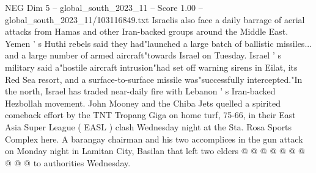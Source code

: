 \begin{textsample}{NEG Dim 5 – global\_south\_2023\_11 – Score 1.00 – global\_south\_2023\_11/103116849.txt}
Israelis also face a daily barrage of aerial attacks from Hamas and other Iran-backed groups around the Middle East.
Yemen ' s Huthi rebels said they had"launched a large batch of ballistic missiles... and a large number of armed aircraft"towards Israel on Tuesday.
Israel ' s military said a"hostile aircraft intrusion"had set off warning sirens in Eilat, its Red Sea resort, and a surface-to-surface missile was"successfully intercepted."In the north, Israel has traded near-daily fire with Lebanon ' s Iran-backed Hezbollah movement.
John Mooney and the Chiba Jets quelled a spirited comeback effort by the TNT Tropang Giga on home turf, 75-66, in their East Asia Super League ( EASL ) clash Wednesday night at the Sta.
Rosa Sports Complex here.
A barangay chairman and his two accomplices in the gun attack on Monday night in Lamitan City, Basilan that left two elders @ @ @ @ @ @ @ @ @ @ to authorities Wednesday.

\end{textsample}

